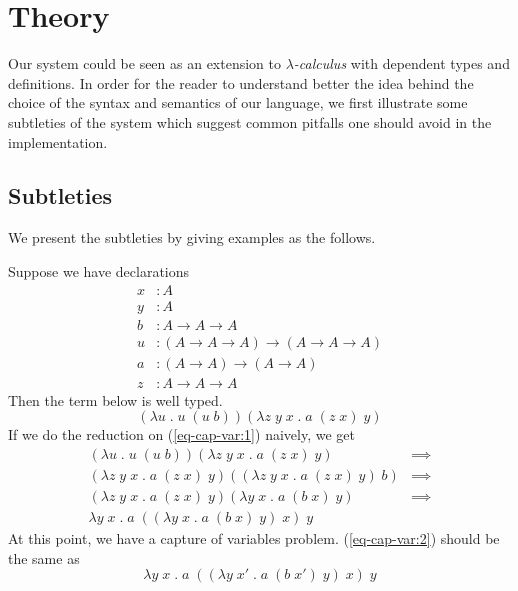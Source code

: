 \chapter{Theory} \label{chapter:theory}
Our system could be seen as an extension to \emph{$\lambda$-calculus} with dependent types and definitions. In order for the reader to understand better the idea behind the choice of the syntax and semantics of our language, we first illustrate some subtleties of the system which suggest common pitfalls one should avoid in the implementation.
\section{Subtleties} \label{theory:subtleties}
We present the subtleties by giving examples as the follows. 
\begin{example}\label{theory:example-1}
  Suppose we have declarations
  \begin{align*}
    x &: A \\
    y &: A \\
    b &: A \to A \to A \\
    u &: (A \to A \to A) \to (A \to A \to A) \\
    a &: (A \to A) \to (A \to A) \\
    z &: A \to A \to A
  \end{align*}
  Then the term below is well typed.
  \begin{equation}\label{eq-cap-var:1}
    (\lambda u \; . \; u \; (u \; b)) (\lambda z \; y \; x \; . \; a \; (z \; x) \; y)
  \end{equation}
  If we do the reduction on (\ref{eq-cap-var:1}) naively, we get
  \begin{align}
    (\lambda u \; . \; u \; (u \; b)) (\lambda z \; y \; x \; . \; a \; (z \; x) \; y) & \implies \nonumber \\
    (\lambda z \; y \; x \; . \; a \; (z \; x) \; y) ((\lambda z \; y \; x \; . \; a \; (z \; x) \; y) \; b) & \implies \nonumber \\
    (\lambda z \; y \; x \; . \; a \; (z \; x) \; y) (\lambda y \; x \; . \; a \; (b \; x) \; y) & \implies \nonumber \\
    \lambda y \; x \; . \; a \; ((\lambda y \; x \; . \; a \; (b \; x) \; y)\; x) \; y \label{eq-cap-var:2}
  \end{align}
  At this point, we have a capture of variables problem. (\ref{eq-cap-var:2}) should be the same as
  \[ \lambda y \; x \; . \; a \; ((\lambda y \; x' \; . \; a \; (b \; x') \; y)\; x) \; y \]

\end{example}
